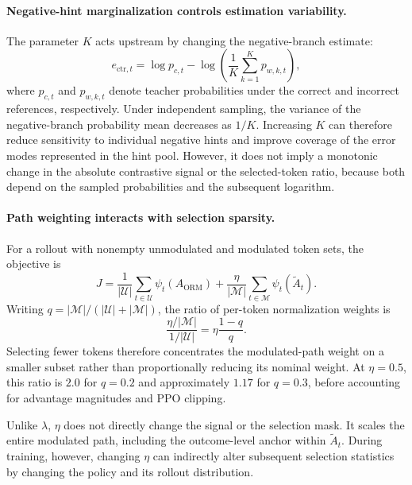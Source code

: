 \paragraph{Negative-hint marginalization controls estimation variability.}
The parameter $K$ acts upstream by changing the negative-branch estimate:
\begin{equation}
e_{\mathrm{ctr},t}
=
\log p_{c,t}
-
\log\left(\frac{1}{K}\sum_{k=1}^{K}p_{w,k,t}\right),
\end{equation}
where $p_{c,t}$ and $p_{w,k,t}$ denote teacher probabilities under the correct and incorrect references, respectively. Under independent sampling, the variance of the negative-branch probability mean decreases as $1/K$. Increasing $K$ can therefore reduce sensitivity to individual negative hints and improve coverage of the error modes represented in the hint pool. However, it does not imply a monotonic change in the absolute contrastive signal or the selected-token ratio, because both depend on the sampled probabilities and the subsequent logarithm.

\paragraph{Path weighting interacts with selection sparsity.}
For a rollout with nonempty unmodulated and modulated token sets, the objective is
\begin{equation}
J
=
\frac{1}{|\mathcal U|}
\sum_{t\in\mathcal U}\psi_t(A_{\mathrm{ORM}})
+
\frac{\eta}{|\mathcal M|}
\sum_{t\in\mathcal M}\psi_t(\widetilde A_t).
\end{equation}
Writing $q=|\mathcal M|/(|\mathcal U|+|\mathcal M|)$, the ratio of per-token normalization weights is
\begin{equation}
\frac{\eta/|\mathcal M|}{1/|\mathcal U|}
=
\eta\frac{1-q}{q}.
\end{equation}
Selecting fewer tokens therefore concentrates the modulated-path weight on a smaller subset rather than proportionally reducing its nominal weight. At $\eta=0.5$, this ratio is $2.0$ for $q=0.2$ and approximately $1.17$ for $q=0.3$, before accounting for advantage magnitudes and PPO clipping.

Unlike $\lambda$, $\eta$ does not directly change the signal or the selection mask. It scales the entire modulated path, including the outcome-level anchor within $\widetilde A_t$. During training, however, changing $\eta$ can indirectly alter subsequent selection statistics by changing the policy and its rollout distribution.

